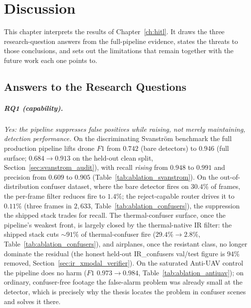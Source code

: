 \chapter{Discussion}
\label{ch:discussion}

This chapter interprets the results of Chapter~\ref{ch:hitl}. It draws the three research-question answers from the full-pipeline evidence, states the threats to those conclusions, and sets out the limitations that remain together with the future work each one points to.

\section{Answers to the Research Questions}
\label{sec:rq_answers}

\paragraph{RQ1 (capability).}
\emph{Yes: the pipeline suppresses false positives while raising, not merely maintaining, detection performance.} On the discriminating Svanstr\"om benchmark the full production pipeline lifts drone $F1$ from $0.742$ (bare detectors) to $0.946$ (full surface; $0.684 \to 0.913$ on the held-out clean split, Section~\ref{sec:svanstrom_audit}), with recall \emph{rising} from $0.948$ to $0.991$ and precision from $0.609$ to $0.905$ (Table~\ref{tab:ablation_svanstrom}). On the out-of-distribution confuser dataset, where the bare detector fires on $30.4\%$ of frames, the per-frame filter reduces fire to $1.4\%$; the reject-capable router drives it to $0.11\%$ (three frames in $2{,}633$, Table~\ref{tab:ablation_confusers}), the suppression the shipped stack trades for recall. The thermal-confuser surface, once the pipeline's weakest front, is largely closed by the thermal-native IR filter: the shipped stack cuts ${\sim}91\%$ of thermal-confuser fire ($29.4\% \to 2.8\%$, Table~\ref{tab:ablation_confusers}), and airplanes, once the resistant class, no longer dominate the residual (the honest held-out IR\_confusers val/test figure is $94\%$ removed, Section~\ref{sec:ir_xmodal_verifier}). On the saturated Anti-UAV control the pipeline does no harm ($F1$ $0.973 \to 0.984$, Table~\ref{tab:ablation_antiuav}); on ordinary, confuser-free footage the false-alarm problem was already small at the detector, which is precisely why the thesis locates the problem in confuser scenes and solves it there.

